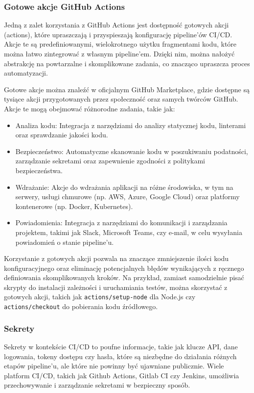\documentclass{article}
\begin{document}
\subsubsection{Gotowe akcje GitHub Actions}

Jedną z zalet korzystania z GitHub Actions jest dostępność gotowych akcji (actions), które upraszczają i przyspieszają konfigurację pipeline'ów CI/CD. Akcje te są predefiniowanymi, wielokrotnego użytku fragmentami kodu, które można łatwo zintegrować z własnym pipeline'em. Dzięki nim, można nałożyć abstrakcję na powtarzalne i skomplikowane zadania, co znacząco upraszcza proces automatyzacji.

Gotowe akcje można znaleźć w oficjalnym GitHub Marketplace, gdzie dostępne są tysiące akcji przygotowanych przez społeczność oraz samych twórców GitHub. Akcje te mogą obejmować różnorodne zadania, takie jak:

\begin{itemize}
\item Analiza kodu: Integracja z narzędziami do analizy statycznej kodu, linterami oraz sprawdzanie jakości kodu.
\item Bezpieczeństwo: Automatyczne skanowanie kodu w poszukiwaniu podatności, zarządzanie sekretami oraz zapewnienie zgodności z politykami bezpieczeństwa.
\item Wdrażanie: Akcje do wdrażania aplikacji na różne środowiska, w tym na serwery, usługi chmurowe (np. AWS, Azure, Google Cloud) oraz platformy kontenerowe (np. Docker, Kubernetes).
\item Powiadomienia: Integracja z narzędziami do komunikacji i zarządzania projektem, takimi jak Slack, Microsoft Teams, czy e-mail, w celu wysyłania powiadomień o stanie pipeline'u.
\end{itemize}

Korzystanie z gotowych akcji pozwala na znaczące zmniejszenie ilości kodu konfiguracyjnego oraz eliminację potencjalnych błędów wynikających z ręcznego definiowania skomplikowanych kroków. Na przykład, zamiast samodzielnie pisać skrypty do instalacji zależności i uruchamiania testów, można skorzystać z gotowych akcji, takich jak \lstinline|actions/setup-node| dla Node.js czy \lstinline|actions/checkout| do pobierania kodu źródłowego.

\subsubsection{Sekrety}

Sekrety w kontekście CI/CD to poufne informacje, takie jak klucze API, dane logowania, tokeny dostępu czy hasła, które są niezbędne do działania różnych etapów pipeline'u, ale które nie powinny być ujawniane publicznie. Wiele platform CI/CD, takich jak Github Actions, Gitlab CI czy Jenkins, umożliwia przechowywanie i zarządzanie sekretami w bezpieczny sposób.
\end{document}
